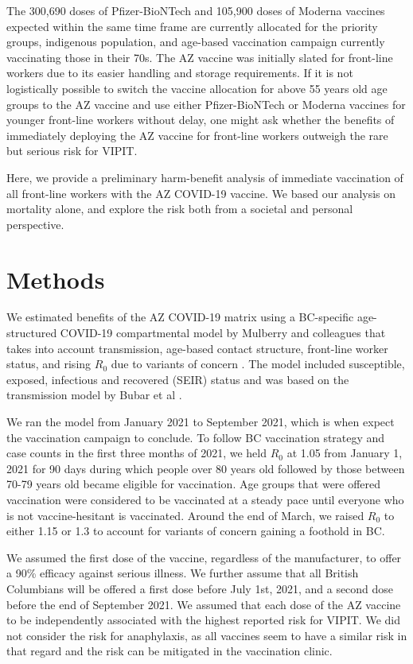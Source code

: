 \documentclass[]{interact}
\theoremstyle{plain}%
\theoremstyle{definition}
\theoremstyle{remark}
\begin{document}
The 300,690 doses of Pfizer-BioNTech and 105,900 doses of Moderna
vaccines expected within the same time frame are currently allocated for
the priority groups, indigenous population, and age-based vaccination
campaign currently vaccinating those in their 70s. The AZ vaccine was
initially slated for front-line workers due to its easier handling and
storage requirements. If it is not logistically possible to switch the
vaccine allocation for above 55 years old age groups to the AZ vaccine
and use either Pfizer-BioNTech or Moderna vaccines for younger
front-line workers without delay, one might ask whether the benefits of
immediately deploying the AZ vaccine for front-line workers outweigh the
rare but serious risk for VIPIT.

Here, we provide a preliminary harm-benefit analysis of immediate
vaccination of all front-line workers with the AZ COVID-19 vaccine. We
based our analysis on mortality alone, and explore the risk both from a
societal and personal perspective.

\hypertarget{methods}{%
\section{Methods}\label{methods}}

We estimated benefits of the AZ COVID-19 matrix using a BC-specific
age-structured COVID-19 compartmental model by Mulberry and colleagues
that takes into account transmission, age-based contact structure,
front-line worker status, and rising \(R_0\) due to variants of concern
\citep{mulberry_vaccine_2021}. The model included susceptible, exposed,
infectious and recovered (SEIR) status and was based on the transmission
model by Bubar et al \citep{bubar_model-informed_2021}.

We ran the model from January 2021 to September 2021, which is when
expect the vaccination campaign to conclude. To follow BC vaccination
strategy and case counts in the first three months of 2021, we held
\(R_0\) at 1.05 from January 1, 2021 for 90 days during which people
over 80 years old followed by those between 70-79 years old became
eligible for vaccination. Age groups that were offered vaccination were
considered to be vaccinated at a steady pace until everyone who is not
vaccine-hesitant is vaccinated. Around the end of March, we raised
\(R_0\) to either 1.15 or 1.3 to account for variants of concern gaining
a foothold in BC.

We assumed the first dose of the vaccine, regardless of the
manufacturer, to offer a 90\% efficacy against serious illness. We
further assume that all British Columbians will be offered a first dose
before July 1st, 2021, and a second dose before the end of September
2021. We assumed that each dose of the AZ vaccine to be independently
associated with the highest reported risk for VIPIT. We did not consider
the risk for anaphylaxis, as all vaccines seem to have a similar risk in
that regard and the risk can be mitigated in the vaccination clinic.
\end{document}
